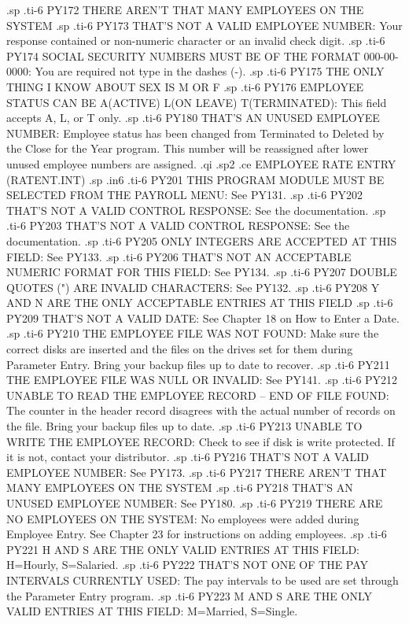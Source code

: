 .sp
.ti-6
PY172 THERE AREN'T THAT MANY EMPLOYEES ON THE SYSTEM
.sp
.ti-6
PY173 THAT'S NOT A VALID EMPLOYEE NUMBER: Your response contained or
non-numeric character or an invalid check digit.
.sp
.ti-6
PY174 SOCIAL SECURITY NUMBERS MUST BE OF THE FORMAT 000-00-0000: You are
required not type in the dashes (-).
.sp
.ti-6
PY175 THE ONLY THING I KNOW ABOUT SEX IS   M  OR  F
.sp
.ti-6
PY176 EMPLOYEE STATUS CAN BE  A(ACTIVE) L(ON LEAVE) T(TERMINATED): This field
accepts A, L, or T only.
.sp
.ti-6
PY180 THAT'S AN UNUSED EMPLOYEE NUMBER: Employee status has been changed
from Terminated to Deleted by the Close for the Year program.  This number
will be reassigned after lower unused employee numbers are assigned.
.qi
.sp2
.ce
EMPLOYEE RATE ENTRY (RATENT.INT)
.sp
.in6
.ti-6
PY201 THIS PROGRAM MODULE MUST BE SELECTED FROM THE PAYROLL MENU: See PY131.
.sp
.ti-6
PY202 THAT'S NOT A VALID CONTROL RESPONSE: See the documentation.
.sp
.ti-6
PY203 THAT'S NOT A VALID CONTROL RESPONSE: See the documentation.
.sp
.ti-6
PY205 ONLY INTEGERS ARE ACCEPTED AT THIS FIELD: See PY133.
.sp
.ti-6
PY206 THAT'S NOT AN ACCEPTABLE NUMERIC FORMAT FOR THIS FIELD: See PY134.
.sp
.ti-6
PY207 DOUBLE QUOTES (") ARE INVALID CHARACTERS: See PY132.
.sp
.ti-6
PY208 Y  AND  N   ARE THE ONLY ACCEPTABLE ENTRIES AT THIS FIELD
.sp
.ti-6
PY209 THAT'S NOT A VALID DATE: See Chapter 18 on How to Enter a Date.
.sp
.ti-6
PY210 THE EMPLOYEE FILE WAS NOT FOUND: Make sure the correct disks are
inserted and the files on the drives set for them during Parameter Entry.
Bring your backup files up to date to recover.
.sp
.ti-6
PY211 THE EMPLOYEE FILE WAS NULL OR INVALID: See PY141.
.sp
.ti-6
PY212 UNABLE TO READ THE EMPLOYEE RECORD -- END OF FILE FOUND: The counter
in the header record disagrees with the actual number of records on the file.
Bring your backup files up to date.
.sp
.ti-6
PY213 UNABLE TO WRITE THE EMPLOYEE RECORD: Check to see if disk is write
protected.  If it is not, contact your distributor.
.sp
.ti-6
PY216 THAT'S NOT A VALID EMPLOYEE NUMBER:  See PY173.
.sp
.ti-6
PY217 THERE AREN'T THAT MANY EMPLOYEES ON THE SYSTEM
.sp
.ti-6
PY218 THAT'S AN UNUSED EMPLOYEE NUMBER: See PY180.
.sp
.ti-6
PY219 THERE ARE NO EMPLOYEES ON THE SYSTEM: No employees were added
during Employee Entry.	See Chapter 23 for instructions on adding employees.
.sp
.ti-6
PY221 H AND S  ARE THE ONLY VALID ENTRIES AT THIS FIELD: H=Hourly, S=Salaried.
.sp
.ti-6
PY222 THAT'S NOT ONE OF THE PAY INTERVALS CURRENTLY USED:  The pay intervals
to be used are set through the Parameter Entry program.
.sp
.ti-6
PY223 M  AND  S  ARE THE ONLY VALID ENTRIES AT THIS FIELD: M=Married, S=Single.
